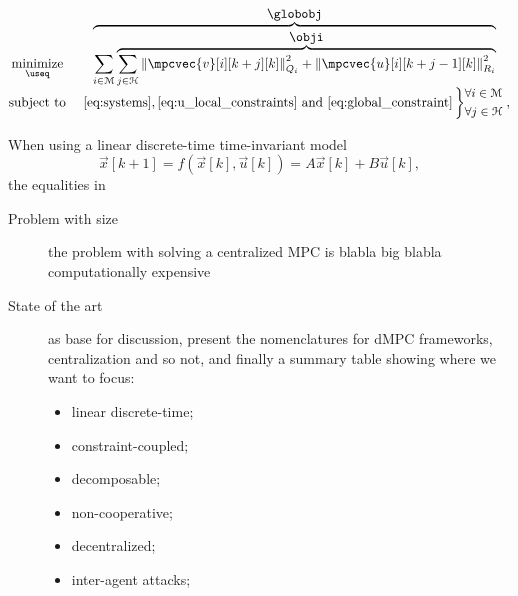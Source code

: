 \documentclass[../main.tex]{subfiles}
\begin{document}
\begin{equation}\label{eq:GOP}
  \begin{matrix}
    \underset{\useq}{\mathrm{minimize}}&\overbrace{\sum\limits_{i\in\set{M}} \overbrace{\sum_{j\in\set{H}}\norm{\mpcvec{v}[i][k+j][k]}^{2}_{Q_i}+\norm{\mpcvec{u}[i][k+j-1][k]}^{2}_{R_i}}^{\textstyle{} \obji}}^{\textstyle{} \globobj}\\
    \mathrm{subject~ to}&~\eqref{eq:systems},\eqref{eq:u_local_constraints}\ \mathrm{and}\ \eqref{eq:global_constraint}
    \left\}\small
      \begin{aligned}
        &\forall i\in\set{M}\\
        &\forall j\in\set{H}
      \end{aligned}\right.,
  \end{matrix}
\end{equation}



When using a linear discrete-time time-invariant model
\begin{equation}
  \vec{x}[k+1]=f(\vec{x}[k],\vec{u}[k])=A\vec{x}[k]+B\vec{u}[k],
\end{equation}
the equalities in


\begin{description}
  \item[Problem with size] the problem with solving a centralized MPC is blabla big blabla computationally expensive
  \item[State of the art] \cite{ChristofidesEtAl2013,ArauzEtAl2021,NotarnicolaNotarstefano2020, MaestreEtAl2014} as base for discussion,
        present the nomenclatures for dMPC frameworks, centralization and so not, and finally a summary table showing where we want to focus:
        \begin{itemize}
          \item linear discrete-time;
          \item constraint-coupled;
          \item decomposable;
          \item non-cooperative;
          \item decentralized;
          \item inter-agent attacks;
        \end{itemize}
\end{description}
\end{document}
